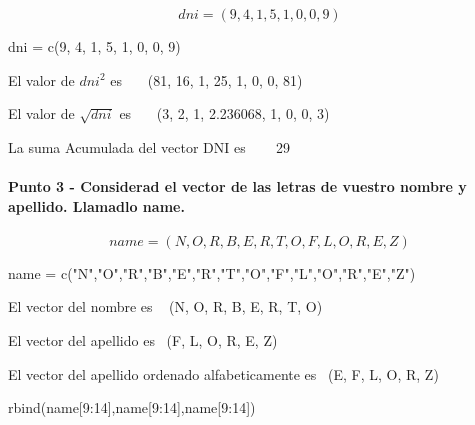 \documentclass[
]{article}
\newenvironment{Shaded}{\begin{snugshade}}{\end{snugshade}}
\newcommand{\DecValTok}[1]{\textcolor[rgb]{0.00,0.00,0.81}{#1}}
\newcommand{\FunctionTok}[1]{\textcolor[rgb]{0.00,0.00,0.00}{#1}}
\newcommand{\NormalTok}[1]{#1}
\newcommand{\OtherTok}[1]{\textcolor[rgb]{0.56,0.35,0.01}{#1}}
\newcommand{\SpecialCharTok}[1]{\textcolor[rgb]{0.00,0.00,0.00}{#1}}
\newcommand{\StringTok}[1]{\textcolor[rgb]{0.31,0.60,0.02}{#1}}
\begin{document}
\[dni = (9, 4, 1, 5, 1, 0, 0, 9)\]

\begin{Shaded}
\begin{Highlighting}[]
\NormalTok{dni }\OtherTok{=} \FunctionTok{c}\NormalTok{(}\DecValTok{9}\NormalTok{, }\DecValTok{4}\NormalTok{, }\DecValTok{1}\NormalTok{, }\DecValTok{5}\NormalTok{, }\DecValTok{1}\NormalTok{, }\DecValTok{0}\NormalTok{, }\DecValTok{0}\NormalTok{, }\DecValTok{9}\NormalTok{)}
\end{Highlighting}
\end{Shaded}

El valor de \(dni^{2}\) es ~~~(81, 16, 1, 25, 1, 0, 0, 81)

El valor de \(\sqrt{dni}\) es ~~~(3, 2, 1, 2.236068, 1, 0, 0, 3)

La suma Acumulada del vector DNI es ~~~ 29

\hypertarget{punto-3---considerad-el-vector-de-las-letras-de-vuestro-nombre-y-apellido.-llamadlo-name.}{%
\paragraph{Punto 3 - Considerad el vector de las letras de vuestro
nombre y apellido. Llamadlo
name.}\label{punto-3---considerad-el-vector-de-las-letras-de-vuestro-nombre-y-apellido.-llamadlo-name.}}

\[name = (N,O,R,B,E,R,T,O,F,L,O,R,E,Z)\]

\begin{Shaded}
\begin{Highlighting}[]
\NormalTok{name }\OtherTok{=} \FunctionTok{c}\NormalTok{(}\StringTok{"N"}\NormalTok{,}\StringTok{"O"}\NormalTok{,}\StringTok{"R"}\NormalTok{,}\StringTok{"B"}\NormalTok{,}\StringTok{"E"}\NormalTok{,}\StringTok{"R"}\NormalTok{,}\StringTok{"T"}\NormalTok{,}\StringTok{"O"}\NormalTok{,}\StringTok{"F"}\NormalTok{,}\StringTok{"L"}\NormalTok{,}\StringTok{"O"}\NormalTok{,}\StringTok{"R"}\NormalTok{,}\StringTok{"E"}\NormalTok{,}\StringTok{"Z"}\NormalTok{)}
\end{Highlighting}
\end{Shaded}

El vector del nombre es ~ (N, O, R, B, E, R, T, O)

El vector del apellido es ~(F, L, O, R, E, Z)

El vector del apellido ordenado alfabeticamente es ~(E, F, L, O, R, Z)

\begin{Shaded}
\begin{Highlighting}[]
\FunctionTok{rbind}\NormalTok{(name[}\DecValTok{9}\SpecialCharTok{:}\DecValTok{14}\NormalTok{],name[}\DecValTok{9}\SpecialCharTok{:}\DecValTok{14}\NormalTok{],name[}\DecValTok{9}\SpecialCharTok{:}\DecValTok{14}\NormalTok{])}
\end{Highlighting}
\end{Shaded}
\end{document}
